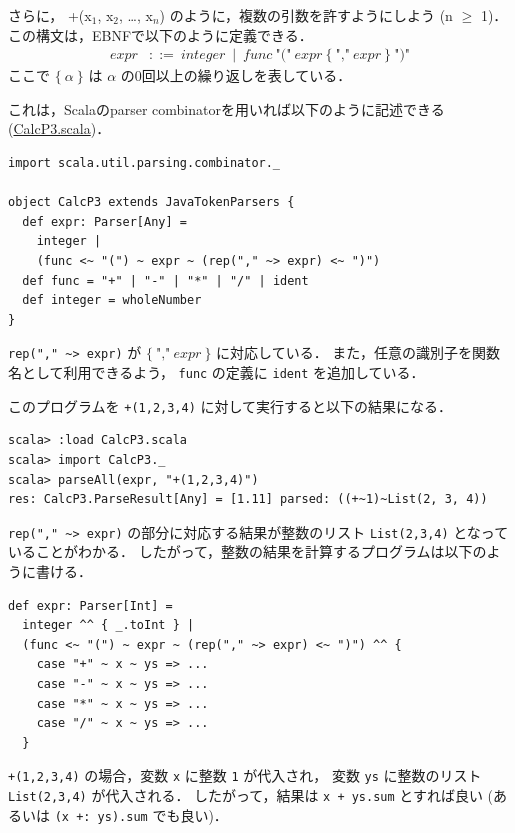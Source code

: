 \documentclass[a4j]{jsarticle}
\begin{document}
さらに，
+(x$_1$, x$_2$, \ldots{}, x$_n$) のように，複数の引数を許すようにしよう (n $\ge$ 1)．
この構文は，EBNFで以下のように定義できる．
\begin{align*}
  \textit{expr} & ::=\ 
  \textit{integer}\ \mid\ 
  \textit{func}\ \mbox{"("}\ \textit{expr}\ \{\ \mbox{","}\ \textit{expr}\ \}\ \mbox{")"}
\end{align*}
ここで $\{\ \alpha\ \}$ は $\alpha$ の0回以上の繰り返しを表している．

これは，Scalaのparser combinatorを用いれば以下のように記述できる
(\href{file:///home/tamura/lect2/ProLang/2018/org/prog/parser/CalcP3.scala}{CalcP3.scala})．


\begin{verbatim}
import scala.util.parsing.combinator._

object CalcP3 extends JavaTokenParsers {
  def expr: Parser[Any] =
    integer |
    (func <~ "(") ~ expr ~ (rep("," ~> expr) <~ ")")
  def func = "+" | "-" | "*" | "/" | ident
  def integer = wholeNumber
}
\end{verbatim}

\texttt{rep("," \textasciitilde{}> expr)} が $\{\ \mbox{","}\ \textit{expr}\ \}$ に対応している．
また，任意の識別子を関数名として利用できるよう， \texttt{func} の定義に \texttt{ident} を追加している．

このプログラムを \texttt{+(1,2,3,4)} に対して実行すると以下の結果になる．

\begin{verbatim}
scala> :load CalcP3.scala
scala> import CalcP3._
scala> parseAll(expr, "+(1,2,3,4)")
res: CalcP3.ParseResult[Any] = [1.11] parsed: ((+~1)~List(2, 3, 4))
\end{verbatim}

\texttt{rep("," \textasciitilde{}> expr)} の部分に対応する結果が整数のリスト \texttt{List(2,3,4)} となっていることがわかる．
したがって，整数の結果を計算するプログラムは以下のように書ける．

\begin{verbatim}
def expr: Parser[Int] =
  integer ^^ { _.toInt } |
  (func <~ "(") ~ expr ~ (rep("," ~> expr) <~ ")") ^^ {
    case "+" ~ x ~ ys => ...
    case "-" ~ x ~ ys => ...
    case "*" ~ x ~ ys => ...
    case "/" ~ x ~ ys => ...
  }
\end{verbatim}

\texttt{+(1,2,3,4)} の場合，変数 \texttt{x} に整数 \texttt{1} が代入され，
変数 \texttt{ys} に整数のリスト \texttt{List(2,3,4)} が代入される．
したがって，結果は \texttt{x + ys.sum} とすれば良い
(あるいは \texttt{(x +: ys).sum} でも良い)．
\end{document}
